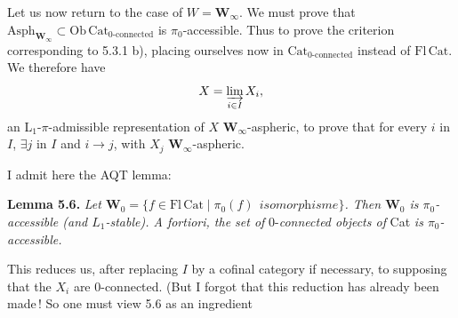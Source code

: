 \documentclass[11pt]{article}
\begin{document}
Let us now return to the case of $W = \mathbf{W}_\infty$. We must prove that $\mathrm{Asph}_{\mathbf{W}_\infty} \subset \mathrm{Ob}\,\mathrm{Cat}_{\text{0-connected}}$ is $\pi_0$-accessible. Thus to prove the criterion corresponding to 5.3.1 b), placing ourselves now in $\mathrm{Cat}_{\text{0-connected}}$ instead of $\mathrm{Fl}\,\mathrm{Cat}$. We therefore have
\[
X = \varinjlim_{i\in I} X_i,
\]
an L$_1$-$\pi$-admissible representation of $X$ $\mathbf{W}_\infty$-aspheric, to prove that for every $i$ in $I$, $\exists j$ in $I$ and $i \longrightarrow j$, with $X_j$ $\mathbf{W}_\infty$-aspheric.

I admit here the AQT lemma:

\textbf{Lemma 5.6.} \textit{Let $\mathbf{W}_0 = \{f \in \mathrm{Fl}\,\mathrm{Cat} \mid \pi_0(f) \ \ \textit{isomorphisme}\}$. Then $\mathbf{W}_0$ is $\pi_0$-accessible (and $L_1$-stable). A fortiori, the set of} 0-\textit{connected objects of} Cat \textit{is $\pi_0$-accessible.}

This reduces us, after replacing $I$ by a cofinal category if necessary, to supposing that the $X_i$ are 0-connected. (But I forgot that this reduction has already been made\,! So one must view 5.6 as an ingredient
\end{document}
